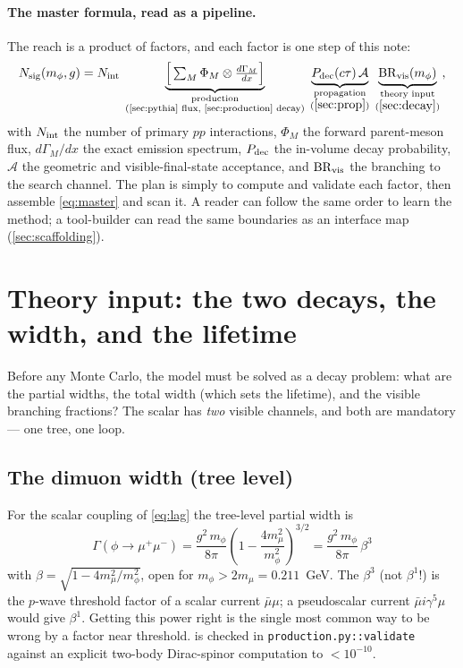 \documentclass[11pt]{article}
\newcommand{\mphi}{m_\phi}
\begin{document}
\paragraph{The master formula, read as a pipeline.} The reach is a product of
factors, and each factor is one step of this note:
\begin{equation}
N_{\rm sig}(\mphi,g)
= N_{\rm int}\;
\underbrace{\Big[\textstyle\sum_M \Phi_M \otimes \tfrac{d\Gamma_{M}}{dx}\Big]}
  _{\substack{\text{production}\\ \text{(\cref{sec:pythia}\ flux,\ \cref{sec:production}\ decay)}}}\;
\underbrace{P_{\rm dec}(c\tau)\,\mathcal{A}}
  _{\substack{\text{propagation}\\(\cref{sec:prop})}}\;
\underbrace{\mathrm{BR}_{\rm vis}(\mphi)}
  _{\substack{\text{theory input}\\(\cref{sec:decay})}}\, ,
\label{eq:master}
\end{equation}
with $N_{\rm int}$ the number of primary $pp$ interactions, $\Phi_M$ the forward
parent-meson flux, $d\Gamma_M/dx$ the exact emission spectrum,
$P_{\rm dec}$ the in-volume decay probability, $\mathcal{A}$ the geometric and
visible-final-state acceptance, and $\mathrm{BR}_{\rm vis}$ the branching to the
search channel. The plan is simply to compute and validate each factor, then
assemble \cref{eq:master} and scan it. A reader can follow the same order to
learn the method; a tool-builder can read the same boundaries as an interface map
(\cref{sec:scaffolding}).

\section{Theory input: the two decays, the width, and the lifetime}
\label{sec:decay}

Before any Monte Carlo, the model must be solved as a decay problem: what are the
partial widths, the total width (which sets the lifetime), and the visible
branching fractions? The scalar has \emph{two} visible channels, and both are
mandatory --- one tree, one loop.

\subsection{The dimuon width (tree level)}
\label{sec:decay:mumu}

For the scalar coupling of \cref{eq:lag} the tree-level partial width is
\begin{equation}
\boxed{\;\Gamma(\phi\to\mu^+\mu^-)=\frac{g^2\,\mphi}{8\pi}
\left(1-\frac{4m_\mu^2}{\mphi^2}\right)^{3/2}
=\frac{g^2\,\mphi}{8\pi}\,\beta^3\;}
\label{eq:width}
\end{equation}
with $\beta=\sqrt{1-4m_\mu^2/\mphi^2}$, open for $\mphi>2m_\mu=0.211$~GeV. The
$\beta^3$ (not $\beta^1$!) is the $p$-wave threshold factor of a scalar current
$\bar\mu\mu$; a pseudoscalar current $\bar\mu i\gamma^5\mu$ would give $\beta^1$.
Getting this power right is the single most common way to be wrong by a factor
near threshold.  is checked in \texttt{production.py::validate}
against an explicit two-body Dirac-spinor computation to $<10^{-10}$.
\end{document}
